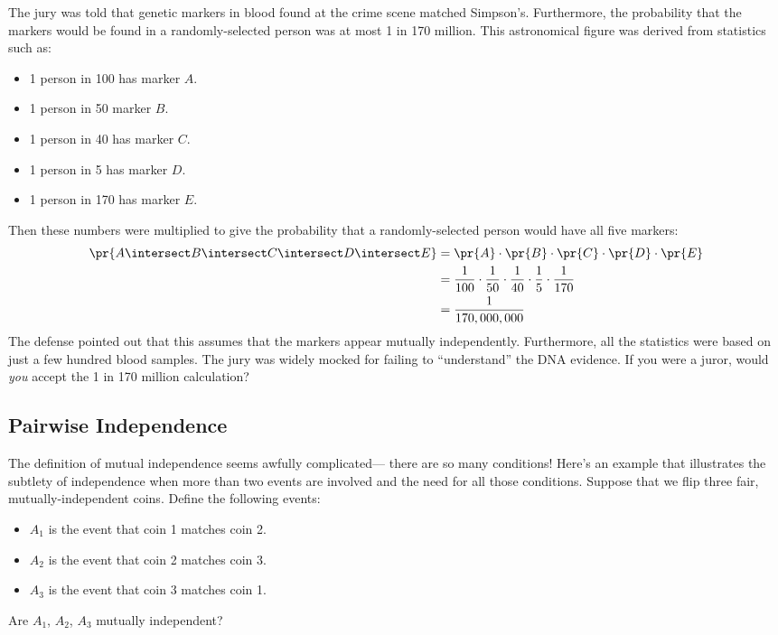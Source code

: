 The jury was told that genetic markers in blood found at the crime
scene matched Simpson's.  Furthermore, the probability that the
markers would be found in a randomly-selected person was at most 1 in
170 million.  This astronomical figure was derived from statistics such
as:
%
\begin{itemize}
\item 1 person in 100 has marker $A$.
\item 1 person in 50 marker $B$.
\item 1 person in 40 has marker $C$.
\item 1 person in 5 has marker $D$.
\item 1 person in 170 has marker $E$.
\end{itemize}
%
Then these numbers were multiplied to give the probability that a
randomly-selected person would have all five markers:
%
\begin{align*}
\pr{A \intersect B \intersect C \intersect D \intersect E}
    & = \pr{A} \cdot \pr{B} \cdot \pr{C} \cdot \pr{D} \cdot \pr{E} \\
    & = \frac{1}{100} \cdot \frac{1}{50} \cdot \frac{1}{40}
                      \cdot \frac{1}{5} \cdot \frac{1}{170} \\
    & = \frac{1}{170,000,000}
\end{align*}
%
The defense pointed out that this assumes that the markers appear
mutually independently.  Furthermore, all the statistics were based on
just a few hundred blood samples.  The jury was widely mocked for
failing to ``understand'' the DNA evidence.  If you were a juror,
would \textit{you} accept the 1 in 170 million calculation?
\fi

\subsection{Pairwise Independence}

The definition of mutual independence seems awfully complicated---
there are so many conditions!  Here's an example that illustrates the
subtlety of independence when more than two events are involved and
the need for all those conditions.  Suppose that we flip three fair,
mutually-independent coins.  Define the following events:
%
\begin{itemize}
\item $A_1$ is the event that coin 1 matches coin 2.
\item $A_2$ is the event that coin 2 matches coin 3.
\item $A_3$ is the event that coin 3 matches coin 1.
\end{itemize}
%
Are $A_1$, $A_2$, $A_3$ mutually independent?

